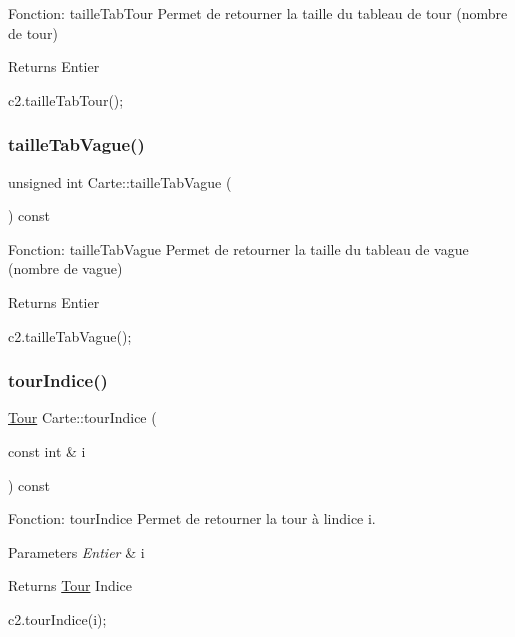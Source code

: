 Fonction\+: taille\+Tab\+Tour Permet de retourner la taille du tableau de tour (nombre de tour) 

\begin{DoxyReturn}{Returns}
Entier 
\begin{DoxyCode}
c2.tailleTabTour();
\end{DoxyCode}
 
\end{DoxyReturn}
\mbox{\label{classCarte_aaca62745b070091a5b1aed99205001d0}} 
\subsubsection{\texorpdfstring{taille\+Tab\+Vague()}{tailleTabVague()}}
{\footnotesize\ttfamily unsigned int Carte\+::taille\+Tab\+Vague (\begin{DoxyParamCaption}{ }\end{DoxyParamCaption}) const}



Fonction\+: taille\+Tab\+Vague Permet de retourner la taille du tableau de vague (nombre de vague) 

\begin{DoxyReturn}{Returns}
Entier 
\begin{DoxyCode}
c2.tailleTabVague();
\end{DoxyCode}
 
\end{DoxyReturn}
\mbox{\label{classCarte_ace227aeaf1d279b2ac3504639816ce1b}} 
\subsubsection{\texorpdfstring{tour\+Indice()}{tourIndice()}}
{\footnotesize\ttfamily \hyperlink{classTour}{Tour} Carte\+::tour\+Indice (\begin{DoxyParamCaption}\item[{const int \&}]{i }\end{DoxyParamCaption}) const}



Fonction\+: tour\+Indice Permet de retourner la tour à l\textquotesingle{}indice i. 


\begin{DoxyParams}{Parameters}
{\em Entier} & i \\
\hline
\end{DoxyParams}
\begin{DoxyReturn}{Returns}
\hyperlink{classTour}{Tour} Indice 
\begin{DoxyCode}
c2.tourIndice(i);
\end{DoxyCode}
 
\end{DoxyReturn}
\mbox{\label{classCarte_ac8403e6b71fd024843cbd24df8a21b82}} 
